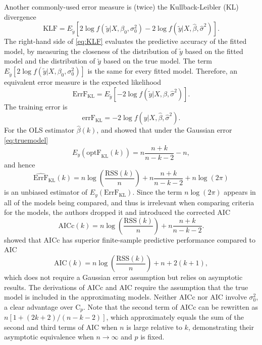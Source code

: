 Another commonly-used error measure is (twice) the Kullback-Leibler (KL) divergence \citep[see, e.g.,][Section 3]{konishi2008information}
\begin{equation}
\text{KLF} = E_{\tilde{y}}\left[ 2\log f(\tilde{y} | X,\beta_0,\sigma_0^2 ) - 2\log f(\tilde{y} | X,\hat\beta,\hat\sigma^2 ) \right].
\label{eq:KLF}
\end{equation}
The right-hand side of \eqref{eq:KLF} evaluates the predictive accuracy of the fitted model, by measuring the closeness of the distribution of $\tilde{y}$ based on the fitted model and the distribution of $\tilde{y}$ based on the true model. The term $E_{\tilde{y}}\left[ 2\log f(\tilde{y} | X,\beta_0,\sigma_0^2 ) \right]$ is the same for every fitted model. Therefore, an equivalent error measure is the expected likelihood
\begin{equation*}
\text{ErrF}_\text{KL} = E_{\tilde{y}}\left[ -2\log f(\tilde{y} | X,\hat\beta,\hat\sigma^2 ) \right].
\end{equation*}
The training error is 
\begin{equation*}
\text{errF}_\text{KL} = -2\log f(y|X,\hat\beta,\hat\sigma^2).
\end{equation*}
For the OLS estimator $\hat\beta(k)$, \citet{sugiura1978further} and \citet{hurvich1989regression} showed that under the Gaussian error \eqref{eq:truemodel}
\begin{equation*}
E_y(\text{optF}_\text{KL}(k)) = n\frac{n+k}{n-k-2}-n,
\end{equation*}
and hence
\begin{equation*}
\widehat{\text{ErrF}}_\text{KL}(k) = n\log\left(\frac{\text{RSS}(k)}{n}\right) + n\frac{n+k}{n-k-2} + n\log(2\pi)
\end{equation*}
is an unbiased estimator of $E_y(\text{ErrF}_\text{KL})$. Since the term $n\log(2\pi)$ appears in all of the models being compared, and thus is irrelevant when comparing criteria for the models, the authors dropped it and introduced the corrected AIC
\begin{equation}
\text{AICc}(k) = n \log\left( \frac{\text{RSS}(k)}{n}\right) + n\frac{n+k}{n-k-2}.
\label{eq:aicc_subsetselection}
\end{equation}
\citet{Hurvich1991} showed that AICc has superior finite-sample predictive performance compared to AIC \citep{Akaike1973}
\begin{equation*}
\text{AIC}(k) = n \log\left( \frac{\text{RSS}(k)}{n}\right) + n + 2(k+1),
\end{equation*}
which does not require a Gaussian error assumption but relies on asymptotic results. The derivations of AICc and AIC require the assumption that the true model is included in the approximating models. Neither AICc nor AIC involve $\sigma_0^2$, a clear advantage over C$_p$. Note that the second term of AICc can be rewritten as $n[1 + (2k+2)/(n-k-2)]$, which approximately equals the sum of the second and third terms of AIC when $n$ is large relative to $k$, demonstrating their asymptotic equivalence when $n\rightarrow\infty$ and $p$ is fixed.

